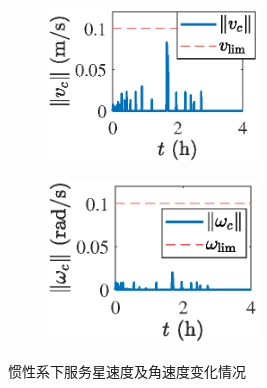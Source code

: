 \documentclass[lang=chs, degree=master, blindreview=false, winfonts=true]{yanputhesis}
\begin{document}
\begin{figure}[htb!]
	\centering
	\begin{minipage}[t]{0.96\textwidth}
		\centering
		\begin{subfigure}[t]{0.47\textwidth}
			\centering
			\includegraphics[width = 2.2in]{picture/chaser_detumble_vec.eps}
			\caption{ }
			\label{fig:detumble_vec_c}
		\end{subfigure}\hfill
		\begin{subfigure}[t]{0.47\textwidth}
			\centering
			\includegraphics[width = 2.2in]{picture/chaser_detumble_ang_vec.eps}
			\caption{ }
			\label{fig:detumble_angvec_c}
		\end{subfigure}\hfill
	\end{minipage}
	\caption{惯性系下服务星速度及角速度变化情况\label{Fig.detumble_Vec_C}}
\end{figure}
\end{document}
